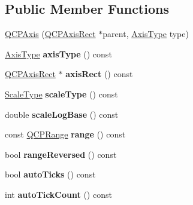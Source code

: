 \subsection*{\-Public \-Member \-Functions}
\begin{DoxyCompactItemize}
\item 
\hyperlink{classQCPAxis_ac62c042968bae0e6d474fcfc57c9b71f}{\-Q\-C\-P\-Axis} (\hyperlink{classQCPAxisRect}{\-Q\-C\-P\-Axis\-Rect} $\ast$parent, \hyperlink{classQCPAxis_ae2bcc1728b382f10f064612b368bc18a}{\-Axis\-Type} type)
\item 
\hypertarget{classQCPAxis_a593c37bf6aa4990326dc09e24f45db7f}{\hyperlink{classQCPAxis_ae2bcc1728b382f10f064612b368bc18a}{\-Axis\-Type} {\bfseries axis\-Type} () const }\label{classQCPAxis_a593c37bf6aa4990326dc09e24f45db7f}

\item 
\hypertarget{classQCPAxis_aada3102af43b029e3879bcbf2bddfabb}{\hyperlink{classQCPAxisRect}{\-Q\-C\-P\-Axis\-Rect} $\ast$ {\bfseries axis\-Rect} () const }\label{classQCPAxis_aada3102af43b029e3879bcbf2bddfabb}

\item 
\hypertarget{classQCPAxis_a8563e13407bc0616da7f7c84e02de170}{\hyperlink{classQCPAxis_a36d8e8658dbaa179bf2aeb973db2d6f0}{\-Scale\-Type} {\bfseries scale\-Type} () const }\label{classQCPAxis_a8563e13407bc0616da7f7c84e02de170}

\item 
\hypertarget{classQCPAxis_ac937d2a602f865aff2ab6c1e288739f6}{double {\bfseries scale\-Log\-Base} () const }\label{classQCPAxis_ac937d2a602f865aff2ab6c1e288739f6}

\item 
\hypertarget{classQCPAxis_ab1ea79a4f5ea4cf42620f8f51c477ac4}{const \hyperlink{classQCPRange}{\-Q\-C\-P\-Range} {\bfseries range} () const }\label{classQCPAxis_ab1ea79a4f5ea4cf42620f8f51c477ac4}

\item 
\hypertarget{classQCPAxis_ade26dc7994ccd8a11f64fd83377ee021}{bool {\bfseries range\-Reversed} () const }\label{classQCPAxis_ade26dc7994ccd8a11f64fd83377ee021}

\item 
\hypertarget{classQCPAxis_afc7f20e30dc2865ff6c39f3281f330c2}{bool {\bfseries auto\-Ticks} () const }\label{classQCPAxis_afc7f20e30dc2865ff6c39f3281f330c2}

\item 
\hypertarget{classQCPAxis_ac87454a1342f5d2939ab59e68b4d515b}{int {\bfseries auto\-Tick\-Count} () const }\label{classQCPAxis_ac87454a1342f5d2939ab59e68b4d515b}


\end{DoxyCompactItemize}
